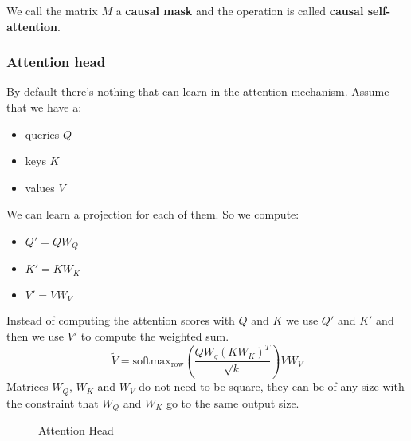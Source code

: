 We call the matrix $M$ a \textbf{causal mask} and the operation is called \textbf{causal self-attention}.

\subsubsection{Attention head}

By default there's nothing that can learn in the attention mechanism.
Assume that we have a:
\begin{itemize}
    \item queries $Q$
    \item keys $K$
    \item values $V$
\end{itemize}
We can learn a projection for each of them.
So we compute:
\begin{itemize}
    \item $Q'=QW_Q$
    \item $K'=KW_K$
    \item $V'=VW_V$
\end{itemize}
Instead of computing the attention scores with $Q$ and $K$ we use $Q'$ and $K'$ and then
we use $V'$ to compute the weighted sum.
\[
    \tilde{V}=\text{softmax}_\text{row}(\frac{QW_q(KW_K)^T}{\sqrt{k}})VW_V
\]
Matrices $W_Q$, $W_K$ and $W_V$ do not need to be square, they can be of any size with the constraint
that $W_Q$ and $W_K$ go to the same output size.
\begin{figure}[H]
    \centering
    \caption{Attention Head}
    \label{fig:attention-head}
\end{figure}

